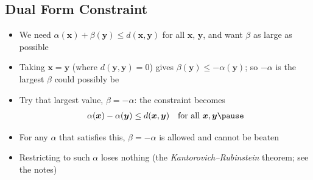 \begin{slide}
\section[-1]{Dual Form Constraint}

\begin{PauseHighLight}\squeeze
  \begin{itemize}
  \item We need $\alpha(\bm{x}) + \beta(\bm{y}) \leq d(\bm{x},\bm{y})$
    for all $\bm{x}$, $\bm{y}$, and want $\beta$ as large as
    possible\pause
  \item Taking $\bm{x}=\bm{y}$ (where $d(\bm{y},\bm{y})=0$) gives
    $\beta(\bm{y}) \leq -\alpha(\bm{y})$;\pause{} so $-\alpha$ is the
    largest $\beta$ could possibly be\pause
  \item Try that largest value, $\beta = -\alpha$: the constraint becomes
    \begin{align*}
      \alpha(\bm{x}) - \alpha(\bm{y}) \leq d(\bm{x},\bm{y})
      \quad\text{for all } \bm{x},\bm{y}\pause
    \end{align*}
  \item For any $\alpha$ that satisfies this, $\beta=-\alpha$ is allowed
    and cannot be beaten\pause
  \item Restricting to such $\alpha$ loses nothing (the
    \emph{Kantorovich--Rubinstein} theorem; see the notes)\pause
  \end{itemize}
\end{PauseHighLight}

\end{slide}


